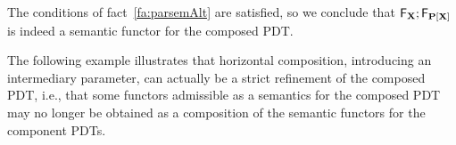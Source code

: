 \begin{PROOF}
The conditions of fact~\ref{fa:parsemAlt} are satisfied, so we conclude that
${\sf {F}}_{{\bf X}};{\sf {F}}_{{\bf P[X]}}$ is indeed a semantic functor for the
composed PDT.
\end{PROOF}
The following example illustrates that horizontal composition, introducing an
 intermediary parameter, can actually be a strict refinement of the composed
 PDT, i.e., that some functors admissible as a semantics for the composed PDT
 may no longer be obtained as a composition of the semantic functors for the
 component PDTs.

